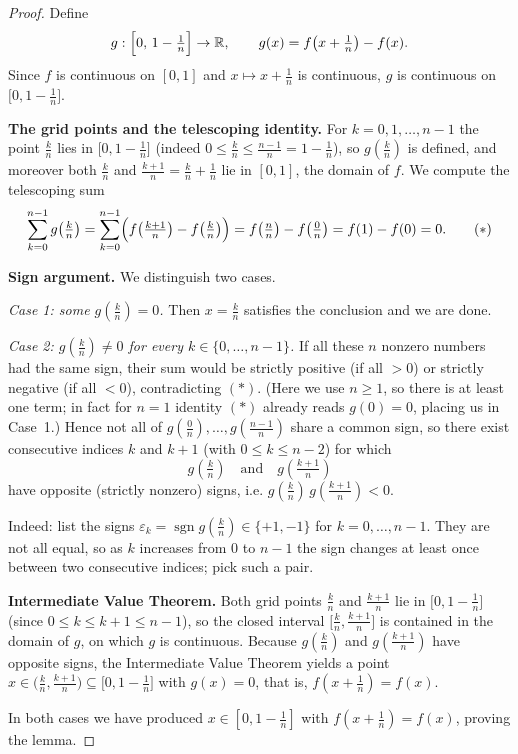 \documentclass{article}
\begin{document}
\begin{proof}
Define
\[
  g:\Bigl[0,\,1-\tfrac1n\Bigr]\to\mathbb{R},\qquad
  g(x)=f\!\left(x+\tfrac1n\right)-f(x).
\]
Since $f$ is continuous on $[0,1]$ and $x\mapsto x+\tfrac1n$ is continuous,
$g$ is continuous on $\bigl[0,1-\tfrac1n\bigr]$.

\medskip
\noindent\textbf{The grid points and the telescoping identity.}
For $k=0,1,\dots,n-1$ the point $\tfrac{k}{n}$ lies in
$\bigl[0,1-\tfrac1n\bigr]$ (indeed $0\le \tfrac kn\le \tfrac{n-1}{n}=1-\tfrac1n$),
so $g(\tfrac kn)$ is defined, and moreover both
$\tfrac kn$ and $\tfrac{k+1}{n}=\tfrac kn+\tfrac1n$ lie in $[0,1]$, the domain
of $f$. We compute the telescoping sum
\[
  \sum_{k=0}^{n-1} g\!\left(\tfrac kn\right)
   =\sum_{k=0}^{n-1}\Bigl(f\!\left(\tfrac{k+1}{n}\right)-f\!\left(\tfrac kn\right)\Bigr)
   = f\!\left(\tfrac nn\right)-f\!\left(\tfrac 0n\right)
   = f(1)-f(0) = 0. \tag{$\ast$}
\]

\medskip
\noindent\textbf{Sign argument.}
We distinguish two cases.

\emph{Case 1: some $g(\tfrac kn)=0$.} Then $x=\tfrac kn$ satisfies the
conclusion and we are done.

\emph{Case 2: $g(\tfrac kn)\neq 0$ for every $k\in\{0,\dots,n-1\}$.}
If all these $n$ nonzero numbers had the same sign, their sum would be
strictly positive (if all $>0$) or strictly negative (if all $<0$),
contradicting $(\ast)$. (Here we use $n\ge 1$, so there is at least one term;
in fact for $n=1$ identity $(\ast)$ already reads $g(0)=0$, placing us in
Case~1.) Hence not all of $g(\tfrac0n),\dots,g(\tfrac{n-1}{n})$ share a common
sign, so there exist consecutive indices $k$ and $k+1$ (with
$0\le k\le n-2$) for which
\[
  g\!\left(\tfrac kn\right)\quad\text{and}\quad g\!\left(\tfrac{k+1}{n}\right)
\]
have opposite (strictly nonzero) signs, i.e.
$g(\tfrac kn)\,g(\tfrac{k+1}{n})<0$.

Indeed: list the signs $\varepsilon_k=\operatorname{sgn} g(\tfrac kn)\in\{+1,-1\}$
for $k=0,\dots,n-1$. They are not all equal, so as $k$ increases from $0$ to
$n-1$ the sign changes at least once between two consecutive indices; pick such
a pair.

\medskip
\noindent\textbf{Intermediate Value Theorem.}
Both grid points $\tfrac kn$ and $\tfrac{k+1}{n}$ lie in
$\bigl[0,1-\tfrac1n\bigr]$ (since $0\le k\le k+1\le n-1$), so the closed
interval $\bigl[\tfrac kn,\tfrac{k+1}{n}\bigr]$ is contained in the domain of
$g$, on which $g$ is continuous. Because $g(\tfrac kn)$ and $g(\tfrac{k+1}{n})$
have opposite signs, the Intermediate Value Theorem yields a point
$x\in\bigl(\tfrac kn,\tfrac{k+1}{n}\bigr)\subseteq\bigl[0,1-\tfrac1n\bigr]$ with
$g(x)=0$, that is, $f(x+\tfrac1n)=f(x)$.

In both cases we have produced $x\in[0,1-\tfrac1n]$ with $f(x+\tfrac1n)=f(x)$,
proving the lemma.
\end{proof}
\end{document}
